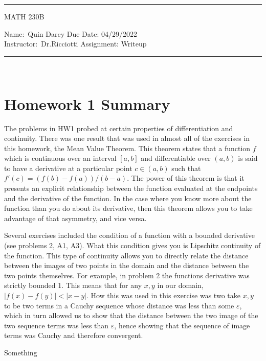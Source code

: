 \documentclass[12pt]{article}
\theoremstyle{definition}
\begin{document}
    \thispagestyle{empty}\hrule

    \begin{center}
        \vspace{.4cm} { \large MATH 230B}
    \end{center}
    {Name:\ Quin Darcy \hspace{\fill} Due Date: 04/29/2022 \\
    { Instructor:}\ Dr.Ricciotti \hspace{\fill} Assignment:
    Writeup  \\ \hrule}\


    \section*{Homework 1 Summary}

    The problems in HW1 probed at certain properties of differentiation and
    continuity. There was one result that was used in almost all of the
    exercises in this homework, the Mean Value Theorem. This theorem states
    that a  function $f$ which is
    continuous over an interval $[a, b]$ and differentiable over $(a, b)$ is
    said to have a derivative at a particular point $c\in(a, b)$ such that
    $f'(c)=(f(b)-f(a))/(b-a)$. The power of this theorem is that it presents an
    explicit relationship between the function evaluated at the endpoints and
    the derivative of the function. In the case where you know more about the
    function than you do about its derivative, then this theorem allows you to
    take advantage of that asymmetry, and vice versa.\par\hfill\par Several
    exercises included the condition of a function with a bounded derivative (see
    problems 2, A1, A3). What this condition gives you is Lipschitz continuity
    of the function. This type of continuity allows you to directly relate the
    distance between the images of two points in the domain and the distance
    between the two points themselves. For example, in problem 2 the functions
    derivative was strictly bounded 1. This means that for any $x, y$ in our domain,
    $|f(x)-f(y)|<|x-y|$. How this was used in this exercise was two take $x,
    y$ to be two terms in a Cauchy sequence whose distance was less than some
    $\varepsilon$, which in turn allowed us to show that the distance between
    the two image of the two
    sequence terms was less than $\varepsilon$, hence showing that the sequence
    of image terms was Cauchy and therefore convergent.\par\hfill\par Something
\end{document}
